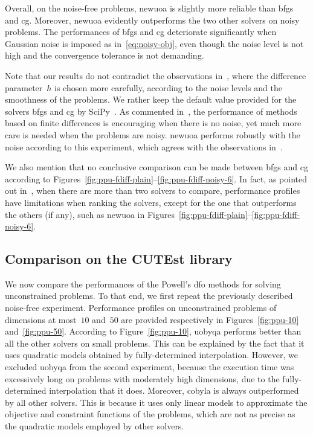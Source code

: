 \documentclass[
    smallextended,  %
    final,        %
]{svjour3}
\begin{document}
Overall, on the noise-free problems, \gls{newuoa} is slightly more reliable than \gls{bfgs} and \gls{cg}.
Moreover, \gls{newuoa} evidently outperforms the two other solvers on noisy problems.
The performances of \gls{bfgs} and \gls{cg} deteriorate significantly when Gaussian noise is imposed as in~\eqref{eq:noisy-obj}, even though the noise level is not high and the convergence tolerance is not demanding.

Note that our results do not contradict the observations in~\cite{Shi_Etal_2022}, where the difference parameter~$h$ is chosen more carefully, according to the noise levels and the smoothness of the problems.
We rather keep the default value provided for the solvers \gls{bfgs} and \gls{cg} by SciPy~\cite{Virtanen_Etal_2020}.
As commented in~\cite{Shi_Etal_2022}, the performance of methods based on finite differences is encouraging when there is no noise, yet much more care is needed when the problems are noisy.
\Gls{newuoa} performs robustly with the noise according to this experiment, which agrees with the observations in~\cite{Shi_Etal_2022}.

We also mention that no conclusive comparison can be made between \gls{bfgs} and \gls{cg} according to Figures~\ref{fig:ppu-fdiff-plain}--\ref{fig:ppu-fdiff-noisy-6}.
In fact, as pointed out in~\cite{Gould_Scott_2016}, when there are more than two solvers to compare, performance profiles have limitations when ranking the solvers, except for the one that outperforms the others (if any), such as \gls{newuoa} in Figures~\ref{fig:ppu-fdiff-plain}--\ref{fig:ppu-fdiff-noisy-6}.

\subsection{Comparison on the CUTEst library}

We now compare the performances of the Powell's \gls{dfo} methods for solving unconstrained problems.
To that end, we first repeat the previously described noise-free experiment.
Performance profiles on unconstrained problems of dimensions at most~$10$ and~$50$ are provided respectively in Figures~\ref{fig:ppu-10} and~\ref{fig:ppu-50}.
According to Figure~\ref{fig:ppu-10}, \gls{uobyqa} performs better than all the other solvers on small problems.
This can be explained by the fact that it uses quadratic models obtained by fully-determined interpolation.
However, we excluded \gls{uobyqa} from the second experiment, because the execution time was excessively long on problems with moderately high dimensions, due to the fully-determined interpolation that it does.
Moreover, \gls{cobyla} is always outperformed by all other solvers.
This is because it uses only linear models to approximate the objective and constraint functions of the problems, which are not as precise as the quadratic models employed by other solvers.
\end{document}
